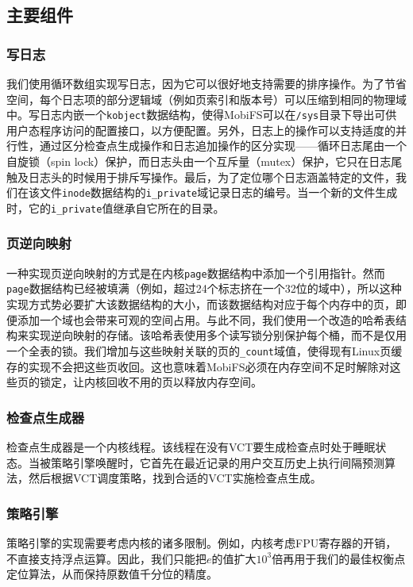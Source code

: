 \subsection{主要组件}
\label{subsec-data-struct}

\subsubsection{写日志}
我们使用循环数组实现写日志，因为它可以很好地支持需要的排序操作。为了节省空间，每个日志项的部分逻辑域（例如页索引和版本号）可以压缩到相同的物理域中。写日志内嵌一个\texttt{kobject}数据结构，使得MobiFS可以在\texttt{/sys}目录下导出可供用户态程序访问的配置接口，以方便配置。另外，日志上的操作可以支持适度的并行性，通过区分检查点生成操作和日志追加操作的区分实现——循环日志尾由一个自旋锁（spin lock）保护，而日志头由一个互斥量（mutex）保护，它只在日志尾触及日志头的时候用于排斥写操作。最后，为了定位哪个日志涵盖特定的文件，我们在该文件\texttt{inode}数据结构的\texttt{i\_private}域记录日志的编号。当一个新的文件生成时，它的\texttt{i\_private}值继承自它所在的目录。

\subsubsection{页逆向映射} 
一种实现页逆向映射的方式是在内核\texttt{page}数据结构中添加一个引用指针。然而\texttt{page}数据结构已经被填满（例如，超过24个标志挤在一个32位的域中），所以这种实现方式势必要扩大该数据结构的大小，而该数据结构对应于每个内存中的页，即便添加一个域也会带来可观的空间占用。与此不同，我们使用一个改造的哈希表结构来实现逆向映射的存储。该哈希表使用多个读写锁分别保护每个桶，而不是仅用一个全表的锁。我们增加与这些映射关联的页的\texttt{\_count}域值，使得现有Linux页缓存的实现不会把这些页收回。这也意味着MobiFS必须在内存空间不足时解除对这些页的锁定，让内核回收不用的页以释放内存空间。

\subsubsection{检查点生成器}
检查点生成器是一个内核线程。该线程在没有VCT要生成检查点时处于睡眠状态。当被策略引擎唤醒时，它首先在最近记录的用户交互历史上执行间隔预测算法，然后根据VCT调度策略，找到合适的VCT实施检查点生成。

\subsubsection{策略引擎}
策略引擎的实现需要考虑内核的诸多限制。例如，内核考虑FPU寄存器的开销，不直接支持浮点运算。因此，我们只能把$e$的值扩大$10^3$倍再用于我们的最佳权衡点定位算法，从而保持原数值千分位的精度。

